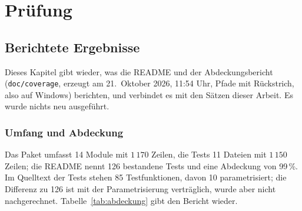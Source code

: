 \part{Prüfung}

\chapter{Berichtete Ergebnisse}
\label{chap:berichtet}

Dieses Kapitel gibt wieder, was die README und der Abdeckungsbericht (\texttt{doc/coverage}, erzeugt am 21.~Oktober 2026, 11:54 Uhr, Pfade mit Rückstrich, also auf Windows) berichten, und verbindet es mit den Sätzen dieser Arbeit. Es wurde nichts neu ausgeführt.

\section{Umfang und Abdeckung}

Das Paket umfasst 14 Module mit $1\,170$ Zeilen, die Tests 11 Dateien mit $1\,150$ Zeilen; die README nennt 126 bestandene Tests und eine Abdeckung von 99\,\%. Im Quelltext der Tests stehen 85 Testfunktionen, davon 10 parametrisiert; die Differenz zu 126 ist mit der Parametrisierung verträglich, wurde aber nicht nachgerechnet. Tabelle~\ref{tab:abdeckung} gibt den Bericht wieder.

